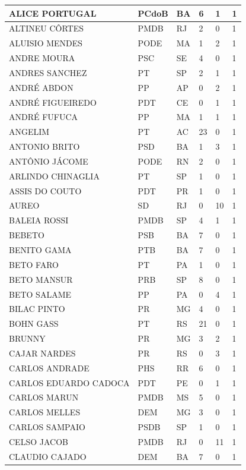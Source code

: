 \begin{apendicesenv}
\begin{longtable}{|L{4cm}|C{2cm}|C{1cm}|C{2cm}|C{1cm}|C{2cm}|}
ALICE PORTUGAL & PCdoB & BA & 6 & 1 & 1 \\ \hline
ALTINEU CÔRTES & PMDB & RJ & 2 & 0 & 1 \\ \hline
ALUISIO MENDES & PODE & MA & 1 & 2 & 1 \\ \hline
ANDRE MOURA & PSC & SE & 4 & 0 & 1 \\ \hline
ANDRES SANCHEZ & PT & SP & 2 & 1 & 1 \\ \hline
ANDRÉ ABDON & PP & AP & 0 & 2 & 1 \\ \hline
ANDRÉ FIGUEIREDO & PDT & CE & 0 & 1 & 1 \\ \hline
ANDRÉ FUFUCA & PP & MA & 1 & 1 & 1 \\ \hline
ANGELIM & PT & AC & 23 & 0 & 1 \\ \hline
ANTONIO BRITO & PSD & BA & 1 & 3 & 1 \\ \hline
ANTÔNIO JÁCOME & PODE & RN & 2 & 0 & 1 \\ \hline
ARLINDO CHINAGLIA & PT & SP & 1 & 0 & 1 \\ \hline
ASSIS DO COUTO & PDT & PR & 1 & 0 & 1 \\ \hline
AUREO & SD & RJ & 0 & 10 & 1 \\ \hline
BALEIA ROSSI & PMDB & SP & 4 & 1 & 1 \\ \hline
BEBETO & PSB & BA & 7 & 0 & 1 \\ \hline
BENITO GAMA & PTB & BA & 7 & 0 & 1 \\ \hline
BETO FARO & PT & PA & 1 & 0 & 1 \\ \hline
BETO MANSUR & PRB & SP & 8 & 0 & 1 \\ \hline
BETO SALAME & PP & PA & 0 & 4 & 1 \\ \hline
BILAC PINTO & PR & MG & 4 & 0 & 1 \\ \hline
BOHN GASS & PT & RS & 21 & 0 & 1 \\ \hline
BRUNNY & PR & MG & 3 & 2 & 1 \\ \hline
CAJAR NARDES & PR & RS & 0 & 3 & 1 \\ \hline
CARLOS ANDRADE & PHS & RR & 6 & 0 & 1 \\ \hline
CARLOS EDUARDO CADOCA & PDT & PE & 0 & 1 & 1 \\ \hline
CARLOS MARUN & PMDB & MS & 5 & 0 & 1 \\ \hline
CARLOS MELLES & DEM & MG & 3 & 0 & 1 \\ \hline
CARLOS SAMPAIO & PSDB & SP & 1 & 0 & 1 \\ \hline
CELSO JACOB & PMDB & RJ & 0 & 11 & 1 \\ \hline
CLAUDIO CAJADO & DEM & BA & 7 & 0 & 1 \\ \hline

\end{longtable}
\end{apendicesenv}
